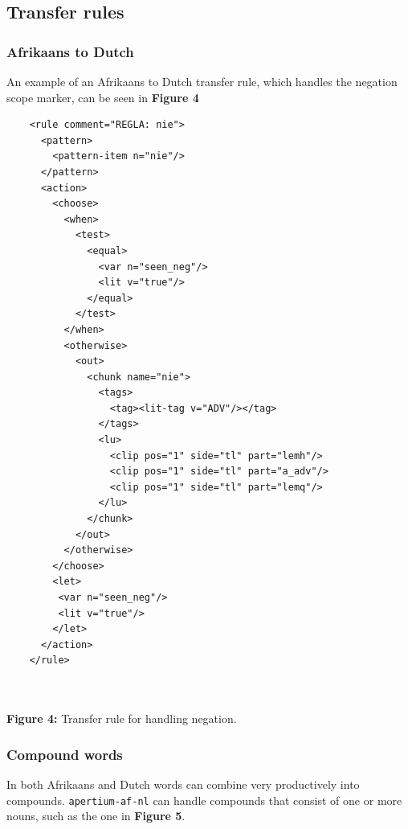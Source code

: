 \documentclass[a0,landscape]{a0poster}
\begin{document}
\begin{multicols}{4}
\subsection{Transfer rules}

\subsubsection{Afrikaans to Dutch}
An example of an Afrikaans to Dutch transfer rule, which handles the negation scope marker, can be seen in
{\bf Figure 4}

\begin{center}
\begin{minipage}[b]{25cm}
\begin{small}
\begin{verbatim}
    <rule comment="REGLA: nie">
      <pattern>
        <pattern-item n="nie"/>
      </pattern>
      <action>
        <choose>
          <when>
            <test>
              <equal>
                <var n="seen_neg"/>
                <lit v="true"/>
              </equal>
            </test>
          </when>
          <otherwise>
            <out>
              <chunk name="nie">
                <tags>
                  <tag><lit-tag v="ADV"/></tag>
                </tags>
                <lu>
                  <clip pos="1" side="tl" part="lemh"/>
                  <clip pos="1" side="tl" part="a_adv"/>
                  <clip pos="1" side="tl" part="lemq"/>
                </lu>
              </chunk>
            </out>
          </otherwise>
        </choose>
        <let>
         <var n="seen_neg"/>
         <lit v="true"/>
        </let>
      </action>
    </rule>
\end{verbatim}
\end{small}
\end{minipage}\\
~\\
\textbf{Figure 4:} Transfer rule for handling negation.
\vspace{0.5cm}
\end{center}

\subsubsection{Compound words}
In both Afrikaans and Dutch words can combine very productively into compounds.
{\small {\tt apertium-af-nl}} can handle compounds that consist of one or more nouns, 
such as the one in {\bf Figure 5}. \\


\end{multicols}
\end{document}
